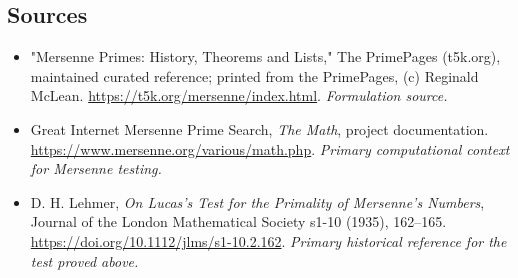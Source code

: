 \documentclass[11pt]{article}
\begin{document}
\subsection{Sources}
\begin{itemize}
\item[S1]"Mersenne Primes: History, Theorems and Lists," The PrimePages (t5k.org), maintained curated reference; printed from the PrimePages, (c) Reginald McLean.
\url{https://t5k.org/mersenne/index.html}.
\textit{Formulation source.}
\item[E1]Great Internet Mersenne Prime Search, \emph{The Math}, project documentation.
\url{https://www.mersenne.org/various/math.php}.
\textit{Primary computational context for Mersenne testing.}
\item[E2]D. H. Lehmer, \emph{On Lucas's Test for the Primality of Mersenne's Numbers}, Journal of the London Mathematical Society s1-10 (1935), 162--165.
\url{https://doi.org/10.1112/jlms/s1-10.2.162}.
\textit{Primary historical reference for the test proved above.}
\end{itemize}
\end{document}
